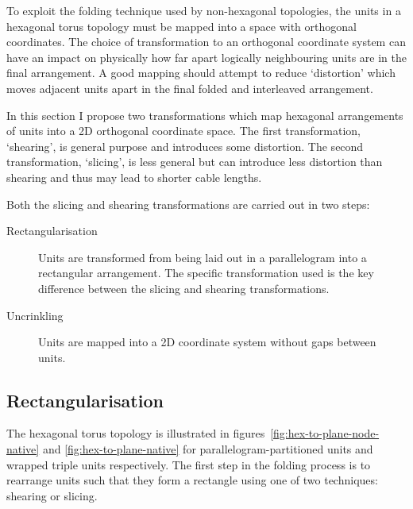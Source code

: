 		To exploit the folding technique used by non-hexagonal topologies, the
		units in a hexagonal torus topology must be mapped into a space with
		orthogonal coordinates. The choice of transformation to an orthogonal
		coordinate system can have an impact on physically how far apart logically
		neighbouring units are in the final arrangement. A good mapping should
		attempt to reduce `distortion' which moves adjacent units apart in the
		final folded and interleaved arrangement.
		
		In this section I propose two transformations which map hexagonal
		arrangements of units into a 2D orthogonal coordinate space. The first
		transformation, `shearing', is general purpose and introduces some
		distortion. The second transformation, `slicing', is less general but can
		introduce less distortion than shearing and thus may lead to shorter cable
		lengths.
		
		Both the slicing and shearing transformations are carried out in two steps:
		
		\begin{description}
			
			\item[Rectangularisation] Units are transformed from being laid out in a
			parallelogram into a rectangular arrangement. The specific transformation
			used is the key difference between the slicing and shearing
			transformations.
			
			\item[Uncrinkling] Units are mapped into a 2D coordinate system without
			gaps between units.
			
		\end{description}
		
		\subsection{Rectangularisation}
			
			The hexagonal torus topology is illustrated in
			figures~\ref{fig:hex-to-plane-node-native} and
			\ref{fig:hex-to-plane-native} for parallelogram-partitioned units and
			wrapped triple units respectively. The first step in the folding process
			is to rearrange units such that they form a rectangle using one of two
			techniques: shearing or slicing.
			
